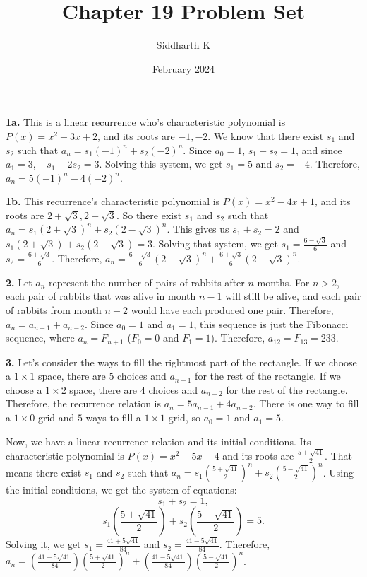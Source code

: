 \documentclass{article}
\title{Chapter 19 Problem Set}
\author{Siddharth K}
\date{February 2024}
\begin{document}
\maketitle

\textbf{1a.} This is a linear recurrence who's characteristic polynomial is $P(x) = x^2 - 3x + 2$, and its roots are $-1, -2$. We know that there exist $s_1$ and $s_2$ such that $a_n = s_1(-1)^n + s_2(-2)^n$. Since $a_0 = 1$, $s_1 + s_2 = 1$, and since $a_1 = 3$, $-s_1 - 2s_2 = 3$. Solving this system, we get $s_1 = 5$ and $s_2 = -4$. Therefore, $a_n = 5(-1)^n - 4(-2)^n$.
\newline

\textbf{1b.} This recurrence's characteristic polynomial is $P(x) = x^2 - 4x + 1$, and its roots are $2 + \sqrt{3}, 2 - \sqrt{3}$. So there exist $s_1$ and $s_2$ such that $a_n = s_1(2 + \sqrt{3})^n + s_2(2 - \sqrt{3})^n$. This gives us $s_1 + s_2 = 2$ and $s_1(2 + \sqrt{3}) + s_2(2 - \sqrt{3}) = 3$. Solving that system, we get $s_1 = \frac{6 - \sqrt{3}}{6}$ and $s_2 = \frac{6 + \sqrt{3}}{6}$. Therefore, $a_n = \frac{6 - \sqrt{3}}{6}(2 + \sqrt{3})^n + \frac{6 + \sqrt{3}}{6}(2 - \sqrt{3})^n$.
\newline

\textbf{2.} Let $a_n$ represent the number of pairs of rabbits after $n$ months. For $n > 2$, each pair of rabbits that was alive in month $n - 1$ will still be alive, and each pair of rabbits from month $n - 2$ would have each produced one pair. Therefore, $a_n = a_{n - 1} + a_{n - 2}$. Since $a_0 = 1$ and $a_1 = 1$, this sequence is just the Fibonacci sequence, where $a_n = F_{n + 1}$ ($F_0 = 0$ and $F_1 = 1$). Therefore, $a_{12} = F_{13} = 233$.
\newline

\textbf{3.} Let's consider the ways to fill the rightmost part of the rectangle. If we choose a $1\times 1$ space, there are $5$ choices and $a_{n - 1}$ for the rest of the rectangle. If we choose a $1\times 2$ space, there are $4$ choices and $a_{n - 2}$ for the rest of the rectangle. Therefore, the recurrence relation is $a_n = 5a_{n - 1} + 4a_{n - 2}$. There is one way to fill a $1\times 0$ grid and $5$ ways to fill a $1\times 1$ grid, so $a_0 = 1$ and $a_1 = 5$.
\newline

Now, we have a linear recurrence relation and its initial conditions. Its characteristic polynomial is $P(x) = x^2 - 5x - 4$ and its roots are $\frac{5 \pm \sqrt{41}}{2}$. That means there exist $s_1$ and $s_2$ such that $a_n = s_1\left(\frac{5 + \sqrt{41}}{2}\right)^n + s_2\left(\frac{5 - \sqrt{41}}{2}\right)^n$. Using the initial conditions, we get the system of equations: $$s_1 + s_2 = 1,$$ $$s_1\left(\frac{5 + \sqrt{41}}{2}\right) + s_2\left(\frac{5 - \sqrt{41}}{2}\right) = 5.$$ Solving it, we get $s_1 = \frac{41 + 5\sqrt{41}}{84}$ and $s_2 = \frac{41 - 5\sqrt{41}}{84}$. Therefore, $a_n = \left(\frac{41 + 5\sqrt{41}}{84}\right)\left(\frac{5 + \sqrt{41}}{2}\right)^n + \left(\frac{41 - 5\sqrt{41}}{84}\right)\left(\frac{5 - \sqrt{41}}{2}\right)^n$.
\newline
\end{document}
